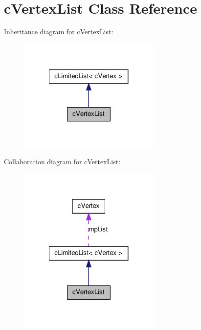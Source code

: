 \hypertarget{classc_vertex_list}{
\section{cVertexList Class Reference}
\label{classc_vertex_list}
}


Inheritance diagram for cVertexList:
\nopagebreak
\begin{figure}[H]
\begin{center}
\leavevmode
\includegraphics[width=200pt]{classc_vertex_list__inherit__graph}
\end{center}
\end{figure}


Collaboration diagram for cVertexList:
\nopagebreak
\begin{figure}[H]
\begin{center}
\leavevmode
\includegraphics[width=200pt]{classc_vertex_list__coll__graph}
\end{center}
\end{figure}
